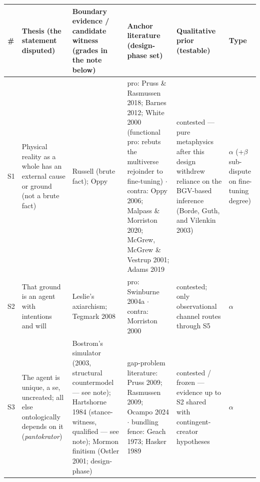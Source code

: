 \begin{longtable}[]{@{}
  >{\raggedright\arraybackslash}p{}
  >{\raggedright\arraybackslash}p{}
  >{\raggedright\arraybackslash}p{}
  >{\raggedright\arraybackslash}p{}
  >{\raggedright\arraybackslash}p{}
  >{\raggedright\arraybackslash}p{}@{}}
\toprule\noalign{}
\begin{minipage}[b]{\linewidth}\raggedright
\#
\end{minipage} & \begin{minipage}[b]{\linewidth}\raggedright
Thesis (the statement disputed)
\end{minipage} & \begin{minipage}[b]{\linewidth}\raggedright
Boundary evidence / candidate witness (grades in the note below)
\end{minipage} & \begin{minipage}[b]{\linewidth}\raggedright
Anchor literature (design-phase set)
\end{minipage} & \begin{minipage}[b]{\linewidth}\raggedright
Qualitative prior (testable)
\end{minipage} & \begin{minipage}[b]{\linewidth}\raggedright
Type
\end{minipage} \\
\midrule\noalign{}
\endhead
\bottomrule\noalign{}
\endlastfoot
S1 & Physical reality as a whole has an external cause or ground (not a brute fact) & Russell (brute fact); Oppy & pro: Pruss \& Rasmussen 2018; Barnes 2012; White 2000 (functional pro: rebuts the multiverse rejoinder to fine-tuning) $\cdot$ contra: Oppy 2006; Malpass \& Morriston 2020; McGrew, McGrew \& Vestrup 2001; Adams 2019 & contested --- pure metaphysics after this design withdrew reliance on the BGV-based inference (Borde, Guth, and Vilenkin 2003) & $\alpha$ (+$\beta$ sub-dispute on fine-tuning degree) \\
S2 & That ground is an agent with intentions and will & Leslie's axiarchism; Tegmark 2008 & pro: Swinburne 2004a $\cdot$ contra: Morriston 2000 & contested; only observational channel routes through S5 & $\alpha$ \\
S3 & The agent is unique, a se, uncreated; all else ontologically depends on it (\emph{pantokrator}) & Bostrom's simulator (2003, structural countermodel --- see note); Hartshorne 1984 (stance-witness, qualified --- see note); Mormon finitism (Ostler 2001; design-phase) & gap-problem literature: Pruss 2009; Rasmussen 2009; Ocampo 2024 $\cdot$ bundling fence: Geach 1973; Hasker 1989 & contested / frozen --- evidence up to S2 shared with contingent-creator hypotheses & $\alpha$ \\

\end{longtable}
